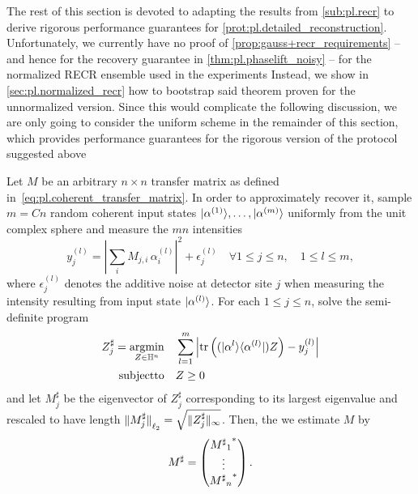 The rest of this section is devoted to adapting the results from \cref{sub:pl.recr} to derive rigorous performance guarantees for \cref{prot:pl.detailed_reconstruction}.
Unfortunately, we currently have no proof of \cref{prop:gauss+recr_requirements} -- and hence for the recovery guarantee in \cref{thm:pl.phaselift_noisy} -- for the normalized RECR ensemble used in the experiments
Instead, we show in \cref{sec:pl.normalized_recr} how to bootstrap said theorem proven for the unnormalized version.
Since this would complicate the following discussion, we are only going to consider the uniform scheme in the remainder of this section, which provides performance guarantees for the rigorous version of the protocol suggested above

\begin{protocol}%
  \label{prot:pl.detailed_reconstruction}
  Let ${M}$ be an arbitrary $n \times n$ transfer matrix as defined in~\eqref{eq:pl.coherent_transfer_matrix}.
  In order to approximately recover it, sample $m = Cn$ random coherent input states $\ket{{\alpha}^{(1)}},\ldots,\ket{{\alpha}^{(m)}}$ uniformly from the unit complex sphere and measure the $mn$ intensities
  \[
    y_j^{(l)} = \left| \sum_i M_{j,i} \, \alpha_i^{(l)} \right|^2 + \epsilon_j^{(l)} \quad \forall 1 \leq j \leq n, \quad 1 \leq l \leq m,
  \]
  where $\epsilon_j^{(l)}$ denotes the additive noise at detector site $j$ when measuring the intensity resulting from input state  $\ket{{\alpha}^{(l)}}$.
  For each $1 \leq j \leq n$, solve the semi-definite program
  \begin{align}
    {Z}^\sharp_{j} = \underset{{Z} \in \mathbb{H}^n}{\operatorname{argmin}}& \quad \sum_{l=1}^m \left| \operatorname{tr} \left( (|{\alpha}^{l} \rangle \langle {\alpha}^{(l)} | )  Z \right) - y_j^{(l)} \right| \label{eq:tmat_recovery_program}\\
    \mathrm{subject to} & \quad {Z} \geq 0 \nonumber
  \end{align}
  and let ${M}_j^\sharp$ be the eigenvector of ${Z}^\sharp_{j}$ corresponding to its largest eigenvalue and rescaled to have length ${\Vert{M}_j^\sharp\Vert}_{\ell_2} = \sqrt{ \| {Z}^\sharp_{j} \|_\infty}$.
  Then, the we estimate ${M}$ by
  \[
    {M}^\sharp =
    \begin{pmatrix}
      {{{M^\sharp}_1}^\ast} \\ \vdots \\  {{{M^\sharp}_n}^\ast}
    \end{pmatrix}.
    \label{eq:pl.transfermat_estimator}
  \]
\end{protocol}

